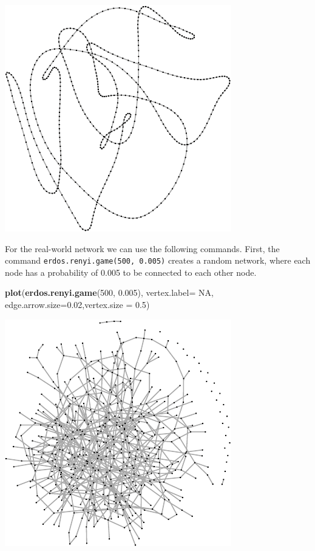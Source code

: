 \documentclass[]{article}
\newenvironment{Shaded}{\begin{snugshade}}{\end{snugshade}}
\newcommand{\KeywordTok}[1]{\textcolor[rgb]{0.13,0.29,0.53}{\textbf{#1}}}
\newcommand{\DataTypeTok}[1]{\textcolor[rgb]{0.13,0.29,0.53}{#1}}
\newcommand{\DecValTok}[1]{\textcolor[rgb]{0.00,0.00,0.81}{#1}}
\newcommand{\FloatTok}[1]{\textcolor[rgb]{0.00,0.00,0.81}{#1}}
\newcommand{\OtherTok}[1]{\textcolor[rgb]{0.56,0.35,0.01}{#1}}
\newcommand{\NormalTok}[1]{#1}
\theoremstyle{definition}
\theoremstyle{definition}
\theoremstyle{definition}
\theoremstyle{remark}
\begin{document}
\includegraphics{ResearchTools_files/figure-latex/unnamed-chunk-53-1.pdf}

For the real-world network we can use the following commands. First, the
command \texttt{erdos.renyi.game(500,\ 0.005)} creates a random network,
where each node has a probability of 0.005 to be connected to each other
node.

\begin{Shaded}
\begin{Highlighting}[]
\KeywordTok{plot}\NormalTok{(}\KeywordTok{erdos.renyi.game}\NormalTok{(}\DecValTok{500}\NormalTok{, }\FloatTok{0.005}\NormalTok{), }\DataTypeTok{vertex.label=} \OtherTok{NA}\NormalTok{, }\DataTypeTok{edge.arrow.size=}\FloatTok{0.02}\NormalTok{,}\DataTypeTok{vertex.size =} \FloatTok{0.5}\NormalTok{)}
\end{Highlighting}
\end{Shaded}

\includegraphics{ResearchTools_files/figure-latex/unnamed-chunk-54-1.pdf}
\end{document}
